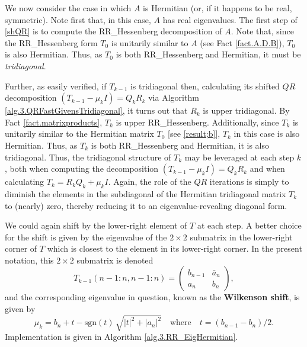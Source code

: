 
\noindent We now consider the case in which $A$ is Hermitian (or, if it happens to be real, symmetric).  Note first that, in this case, $A$ has
real eigenvalues.  The first step of \eqref{shQR} is to compute the RR_Hessenberg decomposition of $A$.
Note that, since the RR_Hessenberg form $T_0$ is unitarily similar to $A$ (see Fact \ref{fact.A.D.B}), $T_0$ is also Hermitian.
Thus, as $T_0$ is both RR_Hessenberg and Hermitian, it must be {\it tridiagonal}.

Further, as easily verified, if $T_{k-1}$ is tridiagonal then, calculating its shifted $QR$ decomposition $(T_{k-1}-\mu_k I)={Q}_{k} {R}_{k}$
via Algorithm \ref{alg.3.QRFastGivensTridiagonal}, it turns out that ${R}_{k}$ is upper tridiagonal.
By Fact \ref{fact.matrixproducts}, $T_k$ is upper RR_Hessenberg.
Additionally, since $T_k$ is unitarily similar to the Hermitian matrix $T_0$ [see \eqref{result;b}],
$T_{k}$ in this case is also Hermitian.  Thus, as $T_{k}$ is both RR_Hessenberg and Hermitian, it is also tridiagonal.
Thus, the tridiagonal structure of $T_{k}$ may be leveraged at each step $k$, both when computing the
decomposition $(T_{k-1}-\mu_k I)={Q}_{k} {R}_{k}$ and when calculating $T_{k} = {R}_{k} {Q}_{k} + \mu_k I$.  Again,
the role of the $QR$ iterations is simply to diminish the elements in the subdiagonal of the Hermitian tridiagonal matrix
$T_{k}$ to (nearly) zero, thereby reducing it to an eigenvalue-revealing diagonal form.

We could again shift by the lower-right element of $T$ at each step.  A better choice for the shift is given by the eigenvalue of the $2\times 2$ submatrix in the
lower-right corner of $T$ which is closest to the element in its lower-right corner.  In the present notation, this $2\times 2$ submatrix is denoted
\begin{equation*}
  T_{k-1}(n-1:n,n-1:n) = \begin{pmatrix} b_{n-1} & \bar a_{n} \\ a_{n} & b_n \end{pmatrix},
\end{equation*}
and the corresponding eigenvalue in question, known as the {\bf Wilkenson shift}, is given by
\begin{equation}
  \mu_k = b_n + t - \textrm{sgn}(t)\,\sqrt{|t|^2 + |a_n|^2} \quad \textrm{where} \quad t=(b_{n-1}-b_n)/2.
\end{equation}
Implementation is given in Algorithm \ref{alg.3.RR_EigHermitian}.
\clearpage

